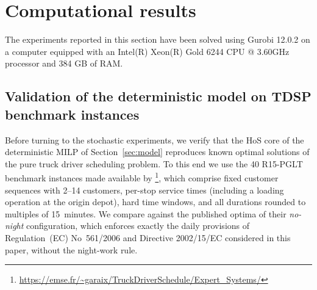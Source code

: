 %
%
%

\section{Computational results} \label{sec:results}
The experiments reported in this section have been solved using Gurobi 12.0.2 on a computer equipped with an Intel(R) Xeon(R) Gold 6244 CPU @ 3.60GHz processor and 384 GB of RAM.


\subsection{Validation of the deterministic model on TDSP benchmark instances}
\label{sec:validation}

Before turning to the stochastic experiments, we verify that the HoS core of the deterministic MILP of Section~\ref{sec:model} reproduces known optimal solutions of the pure truck driver scheduling problem. To this end we use the 40 R15-PGLT benchmark instances made available by \citet{garaix_label-setting_2024}\footnote{\url{https://emse.fr/~garaix/TruckDriverSchedule/Expert_Systems/}}, which comprise fixed customer sequences with 2--14 customers, per-stop service times (including a loading operation at the origin depot), hard time windows, and all durations rounded to multiples of 15~minutes. We compare against the published optima of their \emph{no-night} configuration, which enforces exactly the daily provisions of Regulation~(EC) No~561/2006 and Directive 2002/15/EC considered in this paper, without the night-work rule.


